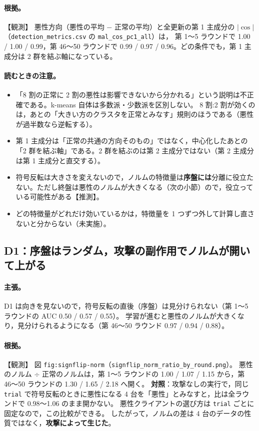 \documentclass[a4j, dvipdfmx]{jsarticle}  %
\begin{document}
\paragraph{根拠。}【観測】
悪性方向（悪性の平均 $-$ 正常の平均）と全更新の第 1 主成分の $|\cos|$（\texttt{detection\_metrics.csv} の \texttt{mal\_cos\_pc1\_all}）は，
第 1〜5 ラウンドで 1.00 / 1.00 / 0.99，第 46〜50 ラウンドで 0.99 / 0.97 / 0.96。どの条件でも，第 1 主成分は 2 群を結ぶ軸になっている。

\paragraph{読むときの注意。}
\begin{itemize}
  \item 「8 割の正常に 2 割の悪性は影響できないから分かれる」という説明は不正確である。k-means 自体は多数派・少数派を区別しない。
        8 割:2 割が効くのは，あとの「大きい方のクラスタを正常とみなす」規則のほうである（悪性が過半数なら逆転する）。
  \item 第 1 主成分は「正常の共通の方向そのもの」ではなく，中心化したあとの「2 群を結ぶ軸」である。2 群を結ぶのは第 2 主成分ではない（第 2 主成分は第 1 主成分と直交する）。
  \item 符号反転は大きさを変えないので，ノルムの特徴量は\textbf{序盤には}分離に役立たない。ただし終盤は悪性のノルムが大きくなる（次の小節）ので，役立っている可能性がある【推測】。
  \item どの特徴量がどれだけ効いているかは，特徴量を 1 つずつ外して計算し直さないと分からない（未実施）。
\end{itemize}

\subsection{D1：序盤はランダム，攻撃の副作用でノルムが開いて上がる}
\label{sec:claim-sf-d1}

\paragraph{主張。}
D1 は向きを見ないので，符号反転の直後（序盤）は見分けられない（第 1〜5 ラウンドの AUC 0.50 / 0.57 / 0.55）。
学習が進むと悪性のノルムが大きくなり，見分けられるようになる（第 46〜50 ラウンド 0.97 / 0.94 / 0.88）。

\paragraph{根拠。}【観測】
図 \texttt{fig:signflip-norm}（\texttt{signflip\_norm\_ratio\_by\_round.png}）。
悪性のノルム $\div$ 正常のノルムは，第 1〜5 ラウンドの 1.00 / 1.07 / 1.15 から，第 46〜50 ラウンドの 1.30 / 1.65 / 2.18 へ開く。
\textbf{対照}：攻撃なしの実行で，同じ \texttt{trial} で符号反転のときに悪性になる 4 台を「悪性」とみなすと，比は全ラウンドで 0.98〜1.06 のまま開かない。
悪性クライアントの選び方は \texttt{trial} ごとに固定なので，この比較ができる。
したがって，ノルムの差は 4 台のデータの性質ではなく，\textbf{攻撃によって生じた}。
\end{document}

